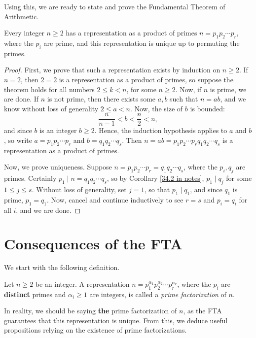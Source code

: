 \documentclass{article}
\begin{document}
Using this, we are ready to state and prove the Fundamental Theorem of Arithmetic.
\begin{theorem}
Every integer $n\geq 2$ has a representation as a product of primes $n = p_1p_2\cdots p_r$, where the $p_i$ are prime, and this representation is unique up to permuting the primes.
\end{theorem}
\begin{proof}
First, we prove that such a representation exists by induction on $n\geq 2$. If $n=2$, then $2=2$ is a representation as a product of primes, so suppose the theorem holds for all numbers $2 \leq k < n$, for some $n \geq 2$. Now, if $n$ is prime, we are done. If $n$ is not prime, then there exists some $a,b$ such that $n = ab$, and we know without loss of generality $2 \leq a < n$. Now, the size of $b$ is bounded:
$$\frac{n}{n-1} < b < \frac n2 < n,$$
and since $b$ is an integer $b \geq 2$. Hence, the induction hypothesis applies to $a$ and $b$, so write $a = p_1p_2\cdots p_r$ and $b = q_1q_2\cdots q_s$. Then $n = ab = p_1p_2\cdots p_rq_1q_2\cdots q_s$ is a representation as a product of primes.

Now, we prove uniqueness. Suppose $n = p_1p_2\cdots p_r = q_1q_2\cdots q_s$, where the $p_i, q_j$ are primes. Certainly $p_1\mid n = q_1q_2\cdots q_s$, so by Corollary \ref{34.2 in notes}, $p_1\mid q_j$ for some $1\leq j \leq s$. Without loss of generality, set $j=1$, so that $p_1 \mid q_1$, and since $q_1$ is prime, $p_1 = q_1$. Now, cancel and continue inductively to see $r=s$ and $p_i = q_i$ for all $i$, and we are done.
\end{proof}

\setcounter{section}{37}
\section{Consequences of the FTA}
We start with the following definition.
\begin{definition}
Let $n\geq 2$ be an integer. A representation $n = p_1^{\alpha_1} p_2^{\alpha_2} \cdots p_r^{\alpha_r}$, where the $p_i$ are \textbf{distinct} primes and $\alpha_i\geq 1$ are integers, is called a \textit{prime factorization} of $n$.
\end{definition}

In reality, we should be saying \textbf{the} prime factorization of $n$, as the FTA guarantees that this representation is unique. From this, we deduce useful propositions relying on the existence of prime factorizations.
\newpage
\end{document}
